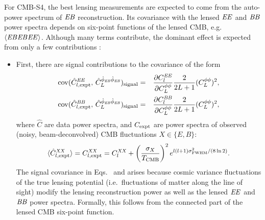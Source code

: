 For CMB-S4, the best lensing measurements are expected to come from the auto-power spectrum of $\mathit{EB}$ reconstruction.  Its covariance with the lensed $\mathit{EE}$ and $\mathit{BB}$ power spectra depends on six-point functions of the lensed CMB, e.g.~$\langle \mathit{EB}\mathit{EB}\mathit{EE} \rangle$. Although many terms contribute, the dominant effect is expected from only a few contributions \cite{Schmittfull:2013uea}:  

\begin{itemize}
\item First, there are signal contributions to the covariance of the form
\begin{eqnarray}
  \label{eq:covEEphiEBphiEB}
  \mathrm{cov}(\hat C^{\mathit{EE}}_{l,\mathrm{expt}},\, 
  \hat{C}^{\hat\phi_{\mathit{EB}}\hat\phi_{\mathit{EB}}}_{L})_\mathrm{signal}
&=&
\frac{\partial C^{\mathit{EE}}_l}{\partial C^{\phi\phi}_{L}}
\frac{2}{2L+1} (C^{\phi\phi}_{L})^2,\\
  \label{eq:covBBphiEBphiEB}
  \mathrm{cov}(\hat C^{\mathit{BB}}_{l,\mathrm{expt}},\, 
  \hat{C}^{\hat\phi_{\mathit{EB}}\hat\phi_{\mathit{EB}}}_{L})_\mathrm{signal}
&=&
\frac{\partial C^{\mathit{BB}}_l}{\partial C^{\phi\phi}_{L}}
\frac{2}{2L+1} (C^{\phi\phi}_{L})^2,
\end{eqnarray}
where $\hat C$ are data power spectra, and $C_{\mathrm{expt}}$ are power spectra of observed (noisy, beam-deconvolved) CMB fluctuations $X\in \{E,B\}$:
\begin{equation}
  \label{eq:CXXexptExpectation}
  \langle\hat C^{\mathit{XX}}_{l,\mathrm{expt}}\rangle = 
 C^{\mathit{XX}}_{l,\mathrm{expt}} = C^{\mathit{XX}}_{l}
+ \left(\frac{\sigma_X}{T_\mathrm{CMB}}\right)^2 
  e^{l(l+1)\sigma^2_{\mathrm{FWHM}}/(8\ln 2)}.
\end{equation}
The signal covariance in Eqs.~ and  arises because cosmic variance fluctuations of the true lensing potential (i.e.~fluctuations of matter along the line of sight) modify the lensing reconstruction power as well as the lensed $\mathit{EE}$ and $\mathit{BB}$ power spectra.  Formally, this follows from the connected part of the lensed CMB six-point function.


\end{itemize}
